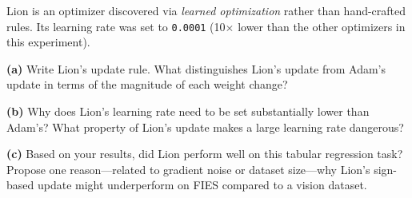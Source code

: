 \documentclass[12pt,a4paper]{article}
\begin{document}
\begin{tcolorbox}[colback=lightblue!40, colframe=myColorB,
  title={\textbf{Question 7 — Lion Optimizer} \hfill \normalfont(10 pts)},
  fonttitle=\normalsize\bfseries, breakable]

Lion is an optimizer discovered via \emph{learned optimization} rather than
hand-crafted rules. Its learning rate was set to \texttt{0.0001}
(10$\times$ lower than the other optimizers in this experiment).

\textbf{(a)} Write Lion's update rule. What distinguishes Lion's update
from Adam's update in terms of the magnitude of each weight change?

\textbf{(b)} Why does Lion's learning rate need to be set substantially lower
than Adam's? What property of Lion's update makes a large learning rate dangerous?

\textbf{(c)} Based on your results, did Lion perform well on this tabular
regression task? Propose one reason—related to gradient noise or dataset size—why
Lion's sign-based update might underperform on FIES compared to a vision dataset.
\end{tcolorbox}
\end{document}
